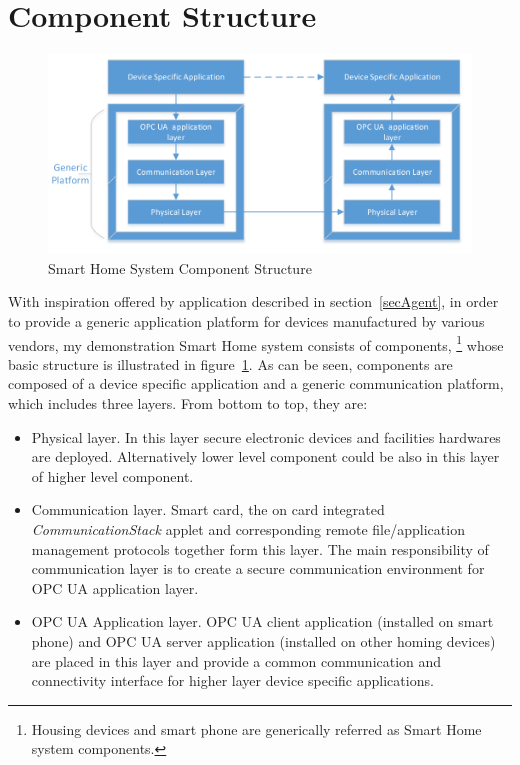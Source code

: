 \section {Component Structure}
 \begin{figure}[!htb]
	\centering
	\includegraphics[width=1\textwidth]{component}
		\caption{Smart Home System Component Structure}
	\label{fig:SmartHomeComponent}
\end{figure}
With inspiration offered by application described in section~\ref{secAgent}, in order to provide a generic application platform for devices manufactured by various vendors, my demonstration Smart Home system consists of components, \footnote{Housing devices and smart phone are generically referred as Smart Home system components.} whose basic structure is illustrated in figure~\ref{fig:SmartHomeComponent}.  As can be seen, components are composed of a device specific application and a generic communication platform, which includes three layers. From bottom to top, they are:

\begin{itemize}
\item Physical layer. In this layer secure electronic devices and facilities hardwares are deployed. Alternatively lower level component could be also in this layer of higher level component.
\item Communication layer. Smart card, the on card integrated \emph{CommunicationStack} applet and corresponding remote file/application management protocols together form this layer. The main responsibility of communication layer is to create a secure communication environment for OPC UA application layer.
\item OPC UA Application layer. OPC UA client application (installed on smart phone) and OPC UA server application (installed on other homing devices) are placed in this layer and provide a common communication and connectivity interface for higher layer device specific applications. 
\end{itemize}

